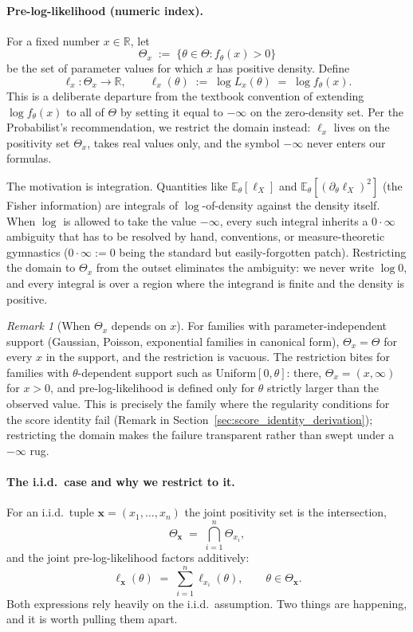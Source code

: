 \documentclass[a4paper,oneside,12pt]{extarticle}
\theoremstyle{plain}
\theoremstyle{definition}
\theoremstyle{remark}
\newtheorem{remark}[proposition]{Remark}
\newcommand*{\E}{\mathbb{E}}
\begin{document}
\paragraph{Pre-log-likelihood (numeric index).}
For a fixed number $x \in \mathbb{R}$, let
\[
  \Theta_x \;:=\; \{\theta \in \Theta : f_\theta(x) > 0\}
\]
be the set of parameter values for which $x$ has positive density.
Define
\[
  \ell_x: \Theta_x \to \mathbb{R},
  \qquad
  \ell_x(\theta) \;:=\; \log L_x(\theta) \;=\; \log f_\theta(x).
\]
This is a deliberate departure from the textbook convention of
extending $\log f_\theta(x)$ to all of $\Theta$ by setting it equal
to $-\infty$ on the zero-density set.  Per the Probabilist's recommendation,
we restrict the domain instead: $\ell_x$ lives on the positivity
set $\Theta_x$, takes real values only, and the symbol $-\infty$
never enters our formulas.

The motivation is integration.  Quantities like $\E_\theta[\ell_X]$
and $\E_\theta[(\partial_\theta \ell_X)^2]$ (the Fisher information)
are integrals of $\log$-of-density against the density itself.  When
$\log$ is allowed to take the value $-\infty$, every such integral
inherits a $0 \cdot \infty$ ambiguity that has to be resolved by
hand, conventions, or measure-theoretic gymnastics ($0 \cdot \infty
:= 0$ being the standard but easily-forgotten patch).  Restricting
the domain to $\Theta_x$ from the outset eliminates the ambiguity:
we never write $\log 0$, and every integral is over a region where
the integrand is finite and the density is positive.

\begin{remark}[When $\Theta_x$ depends on $x$]
For families with parameter-independent support (Gaussian, Poisson,
exponential families in canonical form), $\Theta_x = \Theta$ for
every $x$ in the support, and the restriction is vacuous.  The
restriction bites for families with $\theta$-dependent support such
as Uniform$[0,\theta]$: there, $\Theta_x = (x,\infty)$ for $x>0$,
and pre-log-likelihood is defined only for $\theta$ strictly larger
than the observed value.  This is precisely the family where the
regularity conditions for the score identity fail
(Remark in Section~\ref{sec:score_identity_derivation}); restricting
the domain makes the failure transparent rather than swept under a
$-\infty$ rug.
\end{remark}

\paragraph{The i.i.d.\ case and why we restrict to it.}
For an i.i.d.\ tuple $\mathbf{x} = (x_1,\ldots,x_n)$ the joint
positivity set is the intersection,
\[
  \Theta_{\mathbf{x}} \;=\; \bigcap_{i=1}^n \Theta_{x_i},
\]
and the joint pre-log-likelihood factors additively:
\[
  \ell_{\mathbf{x}}(\theta) \;=\; \sum_{i=1}^n \ell_{x_i}(\theta),
  \qquad \theta \in \Theta_{\mathbf{x}}.
\]
Both expressions rely heavily on the i.i.d.\ assumption.  Two things
are happening, and it is worth pulling them apart.
\end{document}

